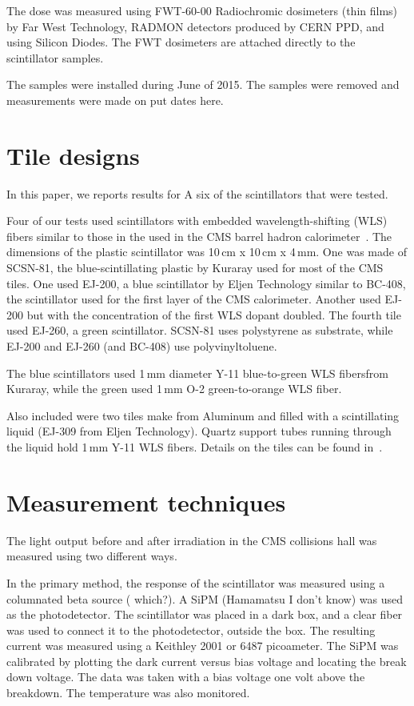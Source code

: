 \documentclass[review]{elsarticle}
\begin{document}
The dose was measured using FWT-60-00 Radiochromic dosimeters (thin films) by Far West Technology, RADMON detectors produced by CERN PPD,  and using Silicon Diodes.  The FWT dosimeters are attached directly to the scintillator samples.


The samples were installed during June of 2015.  The samples were removed
and measurements were made on {\color{red} put dates here}.

\section{Tile designs}
\label{sec:design}

In this paper, we reports results for A six of the scintillators that were tested.

Four of our tests used scintillators with embedded wavelength-shifting (WLS) fibers similar to those in the used in the CMS barrel hadron calorimeter~\cite{CMSHB}.  The dimensions of the plastic scintillator was
10\,cm x 10\,cm x 4\,mm.
One was made of SCSN-81, the blue-scintillating plastic by Kuraray
used for most of the
CMS tiles.  One used EJ-200, a blue scintillator by
Eljen Technology similar to BC-408, the scintillator used for the
first layer of the CMS calorimeter.  Another used EJ-200 but with
the concentration of the first WLS dopant doubled.  The fourth
tile used EJ-260, a green scintillator.
SCSN-81 uses polystyrene as substrate, while EJ-200 and EJ-260
(and BC-408) use polyvinyltoluene.

The blue scintillators used 1\,mm diameter Y-11 blue-to-green
WLS fibersfrom Kuraray,
while the green used 1\,mm O-2 green-to-orange WLS fiber.

Also included were two tiles make from Aluminum and filled with a scintillating liquid (EJ-309 from Eljen Technology).
Quartz support tubes running through the liquid hold 1\,mm Y-11 WLS fibers.
Details on the tiles can be found in~\cite{mdliquidtile}.


\section{Measurement techniques}
\label{sec:techniques}

The light output before and after irradiation in the CMS collisions hall
was measured using two different ways.

In the primary method, the response
of the scintillator was measured 
using a columnated beta source ({\color{red} which?}).
A SiPM (Hamamatsu {\color{red} I don't know}) was used as the photodetector.
The scintillator was placed in a dark box, and a clear fiber was used
to connect it to the photodetector, outside the box.
The resulting current was measured using a Keithley 2001 or 6487 picoameter.
The SiPM was calibrated by plotting the dark current versus bias voltage and locating the break down voltage.  The data was taken with a bias voltage one volt above the breakdown.   The temperature was also monitored.
\end{document}
